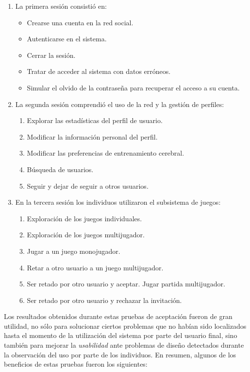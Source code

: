 \renewcommand{\labelenumi}{\bf PA-\arabic{enumi}}
\renewcommand{\labelenumii}{\arabic{enumii}. }
\begin{enumerate}
\item La primera sesión consistió en:
  \begin{itemize}
  \item Crearse una cuenta en la red social.
  \item Autenticarse en el sistema.
  \item Cerrar la sesión.
  \item Tratar de acceder al sistema con datos erróneos.
  \item Simular el olvido de la contraseña para recuperar el acceso a su cuenta.
  \end{itemize}

\item La segunda sesión comprendió el uso de la red y la gestión de perfiles:
  \begin{enumerate}
  \item Explorar las estadísticas del perfil de usuario.
  \item Modificar la información personal del perfil.
  \item Modificar las preferencias de entrenamiento cerebral.
  \item Búsqueda de usuarios.
  \item Seguir y dejar de seguir a otros usuarios.
  \end{enumerate}

\item En la tercera sesión los individuos utilizaron el subsistema de juegos: 
  \begin{enumerate}
  \item Exploración de los juegos individuales.
  \item Exploración de los juegos multijugador.
  \item Jugar a un juego monojugador.
  \item Retar a otro usuario a un juego multijugador.
  \item Ser retado por otro usuario y aceptar. Jugar partida multijugador.
  \item Ser retado por otro usuario y rechazar la invitación.
  \end{enumerate}

\end{enumerate}

Los resultados obtenidos durante estas pruebas de aceptación fueron de gran utilidad, no sólo para solucionar ciertos problemas que no habían sido localizados hasta el momento de la utilización del sistema por parte del usuario final, sino también para mejorar la \emph{usabilidad} ante problemas de diseño detectados durante la observación del uso por parte de los individuos. En resumen, algunos de los beneficios de estas pruebas fueron los siguientes:

